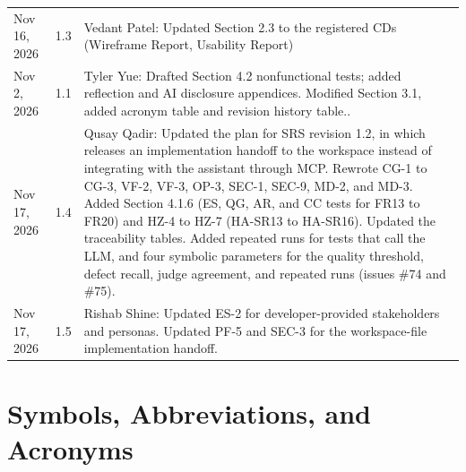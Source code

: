 \documentclass[12pt, titlepage]{article}
\begin{document}
\begin{longtable}{p{2.6cm}p{1.7cm}p{\dimexpr\textwidth-4.3cm-6\tabcolsep\relax}}
Nov 16, 2026 & 1.3 & Vedant Patel: Updated Section 2.3 to the registered CDs
(Wireframe Report, Usability Report)\\
Nov 2, 2026 & 1.1 & Tyler Yue: Drafted Section 4.2 nonfunctional tests; added
reflection and AI disclosure appendices. Modified Section 3.1, added acronym table and revision history table..\\
Nov 17, 2026 & 1.4 & Qusay Qadir: Updated the plan for SRS revision 1.2, in
which \progname{} releases an implementation handoff to the workspace instead
of integrating with the assistant through MCP. Rewrote CG-1 to CG-3, VF-2,
VF-3, OP-3, SEC-1, SEC-9, MD-2, and MD-3. Added Section 4.1.6 (ES, QG, AR, and
CC tests for FR13 to FR20) and HZ-4 to HZ-7 (HA-SR13 to HA-SR16). Updated the
traceability tables. Added repeated runs for tests that call the LLM, and four
symbolic parameters for the quality threshold, defect recall, judge agreement,
and repeated runs (issues \#74 and \#75).\\
Nov 17, 2026 & 1.5 & Rishab Shine: Updated ES-2 for developer-provided
stakeholders and personas. Updated PF-5 and SEC-3 for the workspace-file
implementation handoff.\\
\bottomrule
\end{longtable}

\newpage

\tableofcontents

\listoftables

\newpage

\section{Symbols, Abbreviations, and Acronyms}
\end{document}
